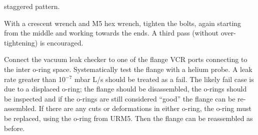 \documentclass[11pt]{article}
\begin{document}
\begin{answerlist}
  staggered pattern.
\item With a crescent wrench and M5 hex wrench, tighten the bolts, again starting from the middle and working towards the ends. A third pass (without over-tightening) is encouraged.
\item Connect the vacuum leak checker to one of the flange VCR ports
  connecting to the inter o-ring space. Systematically test the flange
  with a helium probe. A leak rate greater than 10$^{-7}$ mbar L/s
  should be treated as a fail. The likely fail case is due to a
  displaced o-ring; the flange should be disassembled, the o-rings
  should be inspected and if the o-rings are still considered ``good''
  the flange can be re-assembled. If there are any cuts or
  deformations in either o-ring, the o-ring must be replaced, using
  the o-ring from URM5. Then the flange can be reassembled as before.
\end{answerlist}
\end{document}
